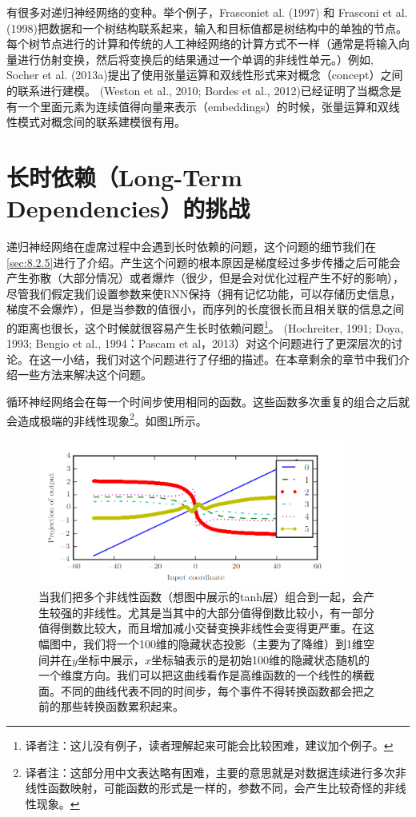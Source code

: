 有很多对递归神经网络的变种。举个例子，Frasconiet al. (1997) 和 Frasconi et al. (1998)把数据和一个树结构联系起来，输入和目标值都是树结构中的单独的节点。每个树节点进行的计算和传统的人工神经网络的计算方式不一样（通常是将输入向量进行仿射变换，然后将变换后的结果通过一个单调的非线性单元。）例如, Socher et al. (2013a)提出了使用张量运算和双线性形式来对概念（concept）之间的联系进行建模。 (Weston et al., 2010; Bordes et al., 2012)已经证明了当概念是有一个里面元素为连续值得向量来表示（embeddings）的时候，张量运算和双线性模式对概念间的联系建模很有用。


\section{长时依赖（Long-Term Dependencies）的挑战}
\label{sec:10.7}
递归神经网络在虚席过程中会遇到长时依赖的问题，这个问题的细节我们在\ref{sec:8.2.5}进行了介绍。产生这个问题的根本原因是梯度经过多步传播之后可能会产生弥散（大部分情况）或者爆炸（很少，但是会对优化过程产生不好的影响），尽管我们假定我们设置参数来使RNN保持（拥有记忆功能，可以存储历史信息，梯度不会爆炸），但是当参数的值很小，而序列的长度很长而且相关联的信息之间的距离也很长，这个时候就很容易产生长时依赖问题\footnote{译者注：这儿没有例子，读者理解起来可能会比较困难，建议加个例子。}。 (Hochreiter, 1991; Doya, 1993; Bengio et al., 1994：Pascam et al，2013）对这个问题进行了更深层次的讨论。在这一小结，我们对这个问题进行了仔细的描述。在本章剩余的章节中我们介绍一些方法来解决这个问题。

循环神经网络会在每一个时间步使用相同的函数。这些函数多次重复的组合之后就会造成极端的非线性现象\footnote{ 译者注：这部分用中文表达略有困难，主要的意思就是对数据连续进行多次非线性函数映射，可能函数的形式是一样的，参数不同，会产生比较奇怪的非线性现象。}。如图\ref{fig:10_15}所示。

\begin{figure}[htbp] %
   \centering
   \includegraphics[width=4in]{fig/chap10/10_15.PNG} 
   \caption{当我们把多个非线性函数（想图中展示的tanh层）组合到一起，会产生较强的非线性。尤其是当其中的大部分值得倒数比较小，有一部分值得倒数比较大，而且增加减小交替变换非线性会变得更严重。在这幅图中，我们将一个100维的隐藏状态投影（主要为了降维）到1维空间并在$y$坐标中展示，$x$坐标轴表示的是初始100维的隐藏状态随机的一个维度方向。我们可以把这曲线看作是高维函数的一个线性的横截面。不同的曲线代表不同的时间步，每个事件不得转换函数都会把之前的那些转换函数累积起来。}
   \label{fig:10_15}
\end{figure}


